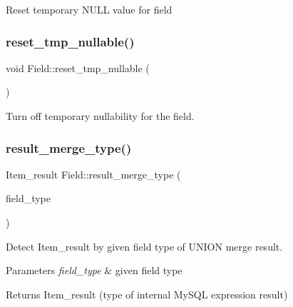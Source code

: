 Reset temporary N\+U\+LL value for field \mbox{\label{classField_a220414646b062b55c25017423f79e5cb}} 
\subsubsection{\texorpdfstring{reset\+\_\+tmp\+\_\+nullable()}{reset\_tmp\_nullable()}}
{\footnotesize\ttfamily void Field\+::reset\+\_\+tmp\+\_\+nullable (\begin{DoxyParamCaption}{ }\end{DoxyParamCaption})\hspace{0.3cm}{\ttfamily [inline]}}

Turn off temporary nullability for the field. \mbox{\label{classField_aa68d124a26fb9eba0545155219d9327e}} 
\subsubsection{\texorpdfstring{result\+\_\+merge\+\_\+type()}{result\_merge\_type()}}
{\footnotesize\ttfamily Item\+\_\+result Field\+::result\+\_\+merge\+\_\+type (\begin{DoxyParamCaption}\item[{enum\+\_\+field\+\_\+types}]{field\+\_\+type }\end{DoxyParamCaption})\hspace{0.3cm}{\ttfamily [static]}}

Detect Item\+\_\+result by given field type of U\+N\+I\+ON merge result.


\begin{DoxyParams}{Parameters}
{\em field\+\_\+type} & given field type\\
\hline
\end{DoxyParams}
\begin{DoxyReturn}{Returns}
Item\+\_\+result (type of internal My\+S\+QL expression result) 
\end{DoxyReturn}
\mbox{\label{classField_afa4ad98d3d0040bb28990c95caa0d86c}} 
